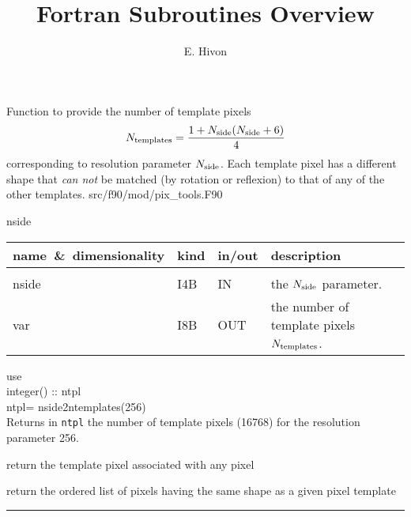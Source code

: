 
\sloppy


\title{\healpix Fortran Subroutines Overview}
 \section[nside2ntemplates]{ }
\label{sub:nside2ntemplates}
\author{E. Hivon}

\begin{facility}
{Function to provide the number of template pixels $${N_{\rm templates}}=\frac{1+{N_{\rm side}}({N_{\rm side}}+6)}{4}$$ corresponding
to resolution parameter ${N_{\rm side}}$. Each template pixel has a different shape that
{\em can not} be matched (by rotation or reflexion) to that of any of the other templates.
}
{src/f90/mod/pix\_tools.F90}
\end{facility}

\begin{f90function}
{nside}
\end{f90function}

\begin{arguments}
{
\begin{tabular}{p{0.3\hsize} p{0.05\hsize} p{0.1\hsize} p{0.45\hsize}} \hline  
\textbf{name~\&~dimensionality} & \textbf{kind} & \textbf{in/out} & \textbf{description} \\ \hline
                   &   &   &                           \\ %
nside & I4B & IN & the ${N_{\rm side}}$ parameter. \\
var & I8B & OUT & the number of template pixels ${N_{\rm templates}}$.\\
\end{tabular}
}
\end{arguments}

\begin{example}
{
use  \\
integer() :: ntpl \\
ntpl= nside2ntemplates(256)  \\
}
{
Returns in {\tt ntpl} the number of \healpix template pixels (16768) for the resolution
parameter 256.
}
\end{example}
\begin{related}
  \begin{sulist}{} %
  \item[\htmlref{template\_pixel\_ring}{sub:template_pixel_xxx}]
  \item[\htmlref{template\_pixel\_nest}{sub:template_pixel_xxx}] return the
  template pixel associated with any \healpix pixel
  \item[\htmlref{same\_shape\_pixels\_ring}{sub:same_shape_pixels_xxx}] 
  \item[\htmlref{same\_shape\_pixels\_nest}{sub:same_shape_pixels_xxx}] 
  return
  the ordered list of pixels having the same shape as a given pixel template
  \end{sulist}
\end{related}

\rule{\hsize}{2mm}

